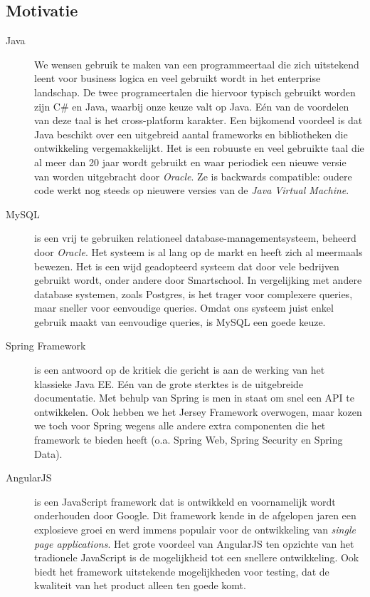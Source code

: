 \documentclass[a4paper]{article}
\begin{document}
\newpage
\subsection{Motivatie}
\begin{description}
    \item[Java] We wensen gebruik te maken van een programmeertaal die zich uitstekend leent voor business logica en veel gebruikt wordt in het enterprise landschap. De twee programeertalen die hiervoor typisch gebruikt worden zijn C\# en Java, waarbij onze keuze valt op Java. Eén van de voordelen van deze taal is het cross-platform karakter. Een bijkomend voordeel is dat Java beschikt over een uitgebreid aantal frameworks en bibliotheken die ontwikkeling vergemakkelijkt. Het is een robuuste en veel gebruikte taal die al meer dan 20 jaar wordt gebruikt en waar periodiek een nieuwe versie van worden uitgebracht door \textit{Oracle}. Ze is backwards compatible: oudere code werkt nog steeds op nieuwere versies van de \textit{Java Virtual Machine}.
    
    \item[MySQL]  is een vrij te gebruiken relationeel database-managementsysteem, beheerd door \textit{Oracle}. Het systeem is al lang op de markt en heeft zich al meermaals bewezen. Het is een wijd geadopteerd systeem dat door vele bedrijven gebruikt wordt, onder andere door Smartschool. In vergelijking met andere database systemen, zoals Postgres, is het trager voor complexere queries, maar sneller voor eenvoudige queries. Omdat ons systeem juist enkel gebruik maakt van eenvoudige queries, is MySQL een goede keuze. 
    
    \item[Spring Framework] is een antwoord op de kritiek die gericht is aan de werking van het klassieke Java EE. Eén van de grote sterktes is de uitgebreide documentatie. Met behulp van Spring is men in staat om snel een API te ontwikkelen. Ook hebben we het Jersey Framework overwogen, maar kozen we toch voor Spring wegens alle andere extra componenten die het framework te bieden heeft (o.a. Spring Web, Spring Security en Spring Data).
    
    \item[AngularJS] is een JavaScript framework dat is ontwikkeld en voornamelijk wordt onderhouden door Google. Dit framework kende in de afgelopen jaren een explosieve groei en werd immens populair voor de ontwikkeling van \textit{single page applications}. Het grote voordeel van AngularJS ten opzichte van het tradionele JavaScript is de mogelijkheid tot een snellere ontwikkeling. Ook biedt het framework uitstekende mogelijkheden voor testing, dat de kwaliteit van het product alleen ten goede komt. 


\end{description}
\end{document}
